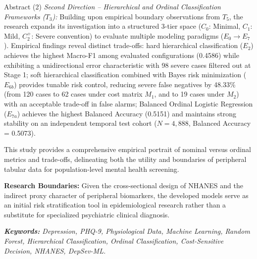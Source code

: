 \documentclass{uetgraduation}
\begin{document}
\begin{preamble}{Abstract}
(2) \textit{Second Direction -- Hierarchical and Ordinal Classification Frameworks ($T_3$):} Building upon empirical boundary observations from $T_5$, the research expands its investigation into a structured 3-tier space ($C_0$: Minimal, $C_1$: Mild, $C_2^+$: Severe convention) to evaluate multiple modeling paradigms ($E_0 \to E_7$). Empirical findings reveal distinct trade-offs: hard hierarchical classification ($E_2$) achieves the highest Macro-F1 among evaluated configurations (0.4586) while exhibiting a unidirectional error characteristic with 98 severe cases filtered out at Stage 1; soft hierarchical classification combined with Bayes risk minimization ($E_{6b}$) provides tunable risk control, reducing severe false negatives by 48.33\% (from 120 cases to 62 cases under cost matrix $M_1$, and to 19 cases under $M_2$) with an acceptable trade-off in false alarms; Balanced Ordinal Logistic Regression ($E_{7a}$) achieves the highest Balanced Accuracy (0.5151) and maintains strong stability on an independent temporal test cohort ($N = 4,888$, Balanced Accuracy = 0.5073).

This study provides a comprehensive empirical portrait of nominal versus ordinal metrics and trade-offs, delineating both the utility and boundaries of peripheral tabular data for population-level mental health screening.

\textbf{Research Boundaries:} Given the cross-sectional design of NHANES and the indirect proxy character of peripheral biomarkers, the developed models serve as an initial risk stratification tool in epidemiological research rather than a substitute for specialized psychiatric clinical diagnosis.

\vspace{0.6cm}
\noindent \textit{\textbf{Keywords:} Depression, PHQ-9, Physiological Data, Machine Learning, Random Forest, Hierarchical Classification, Ordinal Classification, Cost-Sensitive Decision, NHANES, DepSev-ML.}
\end{preamble}
\end{document}
